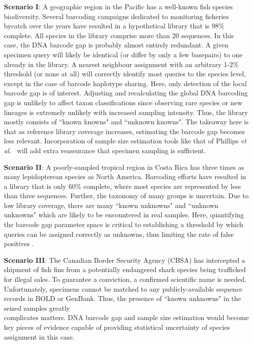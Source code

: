 \textbf{Scenario I}: A geographic region in the Pacific has a well-known fish species \\ biodiversity. Several barcoding campaigns dedicated to monitoring fisheries bycatch over the years have resulted in a hypothetical library that is 98\% complete. All species in the library comprise more than 20 sequences. In this case, the DNA barcode gap is probably almost entirely redundant. A given specimen query will likely be identical (or differ by only a few basepairs) to one already in the library. A nearest neighbour assignment with an arbitrary 1-2\% threshold (or none at all) will correctly identify most queries to the species level, except in the case of barcode haplotype sharing. Here, only detection of the local barcode gap is of interest. Adjusting and recalculating the global DNA barcoding gap is unlikely to affect taxon classifications since observing rare species or new lineages is extremely unlikely with increased sampling intensity. Thus, the library mostly consists of ``known knowns" and ``unknown knowns". The takeaway here is that as reference library coverage increases, estimating the barcode gap becomes less relevant. Incorporation of sample size estimation tools like that of Phillips \textit{et al.}~\cite{phillips2020hacsim} will add extra reassurance that specimen sampling is sufficient.



\textbf{Scenario II}: A poorly-sampled tropical region in Costa Rica has three times as many lepidopterean species as North America. Barcoding efforts have resulted in a library that is only 60\% complete, where most species are represented by less than three sequences. Further, the taxonomy of many groups is uncertain. Due to low library coverage, there are many ``known unknowns" and ``unknown unknowns" which are likely to be encountered in real samples. Here, quantifying the barcode gap parameter space is critical to establishing a threshold by which queries can be assigned correctly as unknowns, thus limiting the rate of false positives \cite{dasmahapatra2010mitochondrial, hickerson2006dna}.



\textbf{Scenario III}: The Canadian Border Security Agency (CBSA) has intercepted a \\ shipment of fish fins from a potentially endangered shark species being trafficked for illegal sales. To guarantee a conviction, a confirmed scientific name is needed. Unfortunately, specimens cannot be matched to any publicly-available sequence records in BOLD or GenBank. Thus, the presence of ``known unknowns" in the seized samples greatly \\ complicates matters. DNA barcode gap and sample size estimation would become key pieces of evidence capable of providing statistical uncertainty of species assignment in this case.



